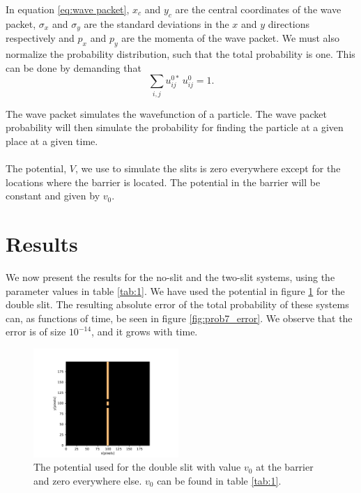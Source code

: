 \documentclass[english,notitlepage,reprint,nofootinbib]{revtex4-2}  %
\begin{document}
	\noindent
	In equation \ref{eq:wave packet}, $x_c$ and $y_c$ are the central
	coordinates of the wave packet, $\sigma_x$ and $\sigma_y$ are the standard
	deviations in the $x$ and $y$ directions respectively and $p_x$ and $p_y$
	are the momenta of the wave packet. We must also normalize the probability
	distribution, such that the total probability is one. This can be done by
	demanding that 
	\begin{equation}
		\sum\limits_{i,j} u^{0*}_{ij} \, u^0_{ij} = 1.
	\end{equation}

	\noindent
	The wave packet simulates the wavefunction of a particle. The wave packet probability
	will then simulate the probability for finding the particle at a given 
	place at a given time. 
	\\ \\
	\noindent
	The potential, $V$, we use to simulate the slits is zero everywhere except 
	for the locations where the barrier is located. The potential in the
	barrier will be constant and given by $v_0$.    


	
	
	\section{Results}\label{sec:results}
	\noindent
	We now present the results for the no-slit and the two-slit systems, using the parameter values in table \ref{tab:1}. We have used the potential in figure \ref{fig:potential} for the double slit.
	The resulting absolute error of the total probability of these systems can, as functions of time, be seen in figure \ref{fig:prob7_error}. We observe
	that the error is of size $10^{-14}$, and it grows with time.


	
	\begin{figure}
		\centering
		\includegraphics[trim={2cm 0cm 2cm 1cm},clip,width=0.49\textwidth]{figures/double_slit.pdf}
		\caption{The potential used for the double slit with value $v_0$ at the barrier and zero everywhere else.
		$v_0$ can be found in table \ref{tab:1}.}
		\label{fig:potential}
	\end{figure}
	
\end{document}
